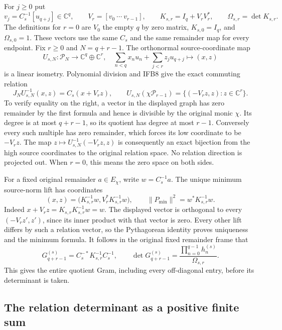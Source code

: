 \documentclass[11pt,a4paper]{article}
\begin{document}
For $j\geq0$ put
\[
 v_j=C_s^{-1}[u_{q+j}]\in\mathbb C^q,\qquad
 V_r=[v_0\ \cdots\ v_{r-1}],\qquad
 K_{s,r}=I_q+V_rV_r^*,\qquad \Omega_{s,r}=\det K_{s,r}.
 \tag{IFB8}
\]
The definitions for $r=0$ are $V_0$ the empty $q$ by zero matrix,
$K_{s,0}=I_q$, and $\Omega_{s,0}=1$. These vectors use the same
$C_s$ and the same remainder map for every endpoint. Fix
$r\geq0$ and $N=q+r-1$. The orthonormal source-coordinate map
\[
 U_{s,N}:\mathcal P_N\longrightarrow\mathbb C^q\oplus\mathbb C^r,
 \quad
 \sum_{n<q}x_nu_n+\sum_{j<r}z_ju_{q+j}\longmapsto(x,z)
\]
is a linear isometry. Polynomial division and IFB8 give the exact
commuting relation
\[
 J_NU_{s,N}^{-1}(x,z)=C_s(x+V_rz),\qquad
 U_{s,N}(\chi\mathcal P_{r-1})
       =\{(-V_rz,z):z\in\mathbb C^r\}.
 \tag{IFB9}
\]
To verify equality on the right, a vector in the displayed graph
has zero remainder by the first formula and hence is divisible by
the original monic $\chi$. Its degree is at most $q+r-1$, so its
quotient has degree at most $r-1$. Conversely every such multiple
has zero remainder, which forces its low coordinate to be $-V_rz$.
The map $z\mapsto U_{s,N}^{-1}(-V_rz,z)$ is consequently an exact
bijection from the high source coordinates to the original relation
space. No relation direction is projected out. When $r=0$, this
means the zero space on both sides.

For a fixed original remainder $a\in E_\chi$, write $w=C_s^{-1}a$.
The unique minimum source-norm lift has coordinates
\[
 (x,z)=\bigl(K_{s,r}^{-1}w, V_r^*K_{s,r}^{-1}w\bigr),
\qquad
 \|P_{\min}\|^2=w^*K_{s,r}^{-1}w.
 \tag{IFB10}
\]
Indeed $x+V_rz=K_{s,r}K_{s,r}^{-1}w=w$. The displayed vector
is orthogonal to every $(-V_rz',z')$, since its inner product with
that vector is zero. Every other lift differs by such a relation
vector, so the Pythagorean identity proves uniqueness and the
minimum formula. It follows in the original fixed remainder frame
that
\[
 G_{q+r-1}^{(s)}=C_s^{-*}K_{s,r}^{-1}C_s^{-1},\qquad
 \det G_{q+r-1}^{(s)}
       =\frac{\prod_{n=0}^{q-1}h_n^{(s)}}{\Omega_{s,r}}.
 \tag{IFB11}
\]
This gives the entire quotient Gram, including every off-diagonal
entry, before its determinant is taken.

\subsection{The relation determinant as a positive finite sum}
\end{document}
